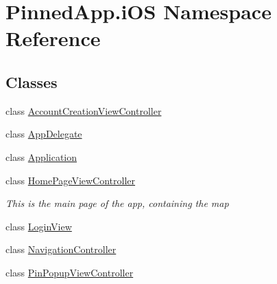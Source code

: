 \hypertarget{namespace_pinned_app_1_1i_o_s}{}\section{Pinned\+App.\+i\+OS Namespace Reference}
\label{namespace_pinned_app_1_1i_o_s}
\subsection*{Classes}
\begin{DoxyCompactItemize}
\item 
class \hyperlink{class_pinned_app_1_1i_o_s_1_1_account_creation_view_controller}{Account\+Creation\+View\+Controller}
\item 
class \hyperlink{class_pinned_app_1_1i_o_s_1_1_app_delegate}{App\+Delegate}
\item 
class \hyperlink{class_pinned_app_1_1i_o_s_1_1_application}{Application}
\item 
class \hyperlink{class_pinned_app_1_1i_o_s_1_1_home_page_view_controller}{Home\+Page\+View\+Controller}
\begin{DoxyCompactList}\small\item\em This is the main page of the app, containing the map \end{DoxyCompactList}\item 
class \hyperlink{class_pinned_app_1_1i_o_s_1_1_login_view}{Login\+View}
\item 
class \hyperlink{class_pinned_app_1_1i_o_s_1_1_navigation_controller}{Navigation\+Controller}
\item 
class \hyperlink{class_pinned_app_1_1i_o_s_1_1_pin_popup_view_controller}{Pin\+Popup\+View\+Controller}
\end{DoxyCompactItemize}
